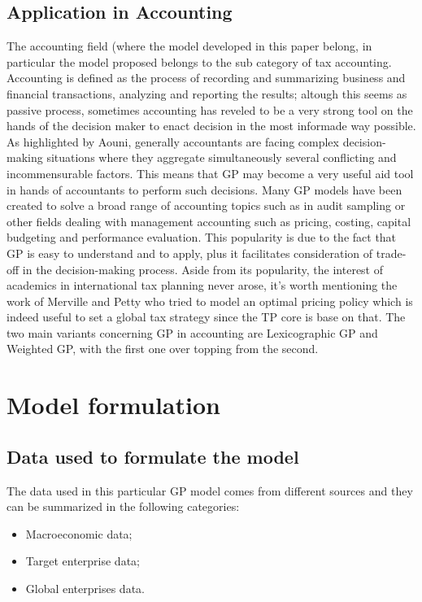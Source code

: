 \documentclass{article}
\begin{document}
\subsection{Application in Accounting}
The accounting field (where the model developed in this paper belong, in particular the model proposed belongs to the sub category of tax accounting. Accounting is defined as the process of recording and summarizing business and financial transactions, analyzing and reporting the results; altough this seems as passive process, sometimes accounting has reveled to be a very strong tool on the hands of the decision maker to enact decision in the most informade way possible.
As highlighted by Aouni\cite{aouni_goal_2017}, generally accountants are facing complex decision-making situations where they aggregate simultaneously several conflicting and incommensurable factors. This means that GP may become a very useful aid tool in hands of accountants to perform such decisions. Many GP models have been created to solve a broad range of accounting topics such as in audit sampling\cite{tayi_integration_1985} or other fields dealing with management accounting such as pricing\cite{tan_multipleobjective_2008}, costing\cite{dowlatshahi_product_2001}, capital budgeting and performance evaluation\cite{hung_integrated_2011}.
This popularity is due to the fact that GP is easy to understand and to apply, plus it facilitates consideration of trade-off in the decision-making process.
Aside from its popularity, the interest of academics in international tax planning never arose,
it’s worth mentioning the work of Merville and Petty\cite{merville_transfer_1978} who tried to model an optimal pricing policy which is indeed useful to set a global tax
strategy since the TP core is base on that.
The two main variants concerning GP in accounting are Lexicographic GP and Weighted GP, with the first one over topping from the second.

\pagebreak

\section{Model formulation}

\subsection{Data used to formulate the model}
The data used in this particular GP model comes from different sources and they can be summarized in the following categories:
\begin{itemize}
    \item Macroeconomic data;
    \item Target enterprise data;
    \item Global enterprises data.
\end{itemize}
\end{document}
